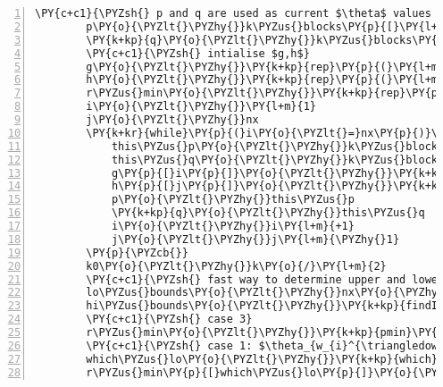 \begin{Verbatim}[commandchars=\\\{\},codes={\catcode`\$=3\catcode`\^=7\catcode`\_=8},gobble=0,numbers=left,fontfamily=fvm,fontshape=n,fontsize=\footnotesize,tabsize=2]
		\PY{c+c1}{\PYZsh{} p and q are used as current $\theta$ values running along the $\Theta$ vector}
		p\PY{o}{\PYZlt{}\PYZhy{}}k\PYZus{}blocks\PY{p}{[}\PY{l+m}{1}\PY{p}{]}
		\PY{k+kp}{q}\PY{o}{\PYZlt{}\PYZhy{}}k\PYZus{}blocks\PY{p}{[}nx\PY{l+m}{+2}\PY{p}{]}
		\PY{c+c1}{\PYZsh{} intialise $g,h$}
		g\PY{o}{\PYZlt{}\PYZhy{}}\PY{k+kp}{rep}\PY{p}{(}\PY{l+m}{0}\PY{p}{,}nx\PY{p}{)}
		h\PY{o}{\PYZlt{}\PYZhy{}}\PY{k+kp}{rep}\PY{p}{(}\PY{l+m}{0}\PY{p}{,}nx\PY{p}{)}
		r\PYZus{}min\PY{o}{\PYZlt{}\PYZhy{}}\PY{k+kp}{rep}\PY{p}{(}\PY{l+m}{0}\PY{p}{,}nx\PY{p}{)}
		i\PY{o}{\PYZlt{}\PYZhy{}}\PY{l+m}{1}
		j\PY{o}{\PYZlt{}\PYZhy{}}nx
		\PY{k+kr}{while}\PY{p}{(}i\PY{o}{\PYZlt{}=}nx\PY{p}{)}\PY{p}{\PYZob{}}
			this\PYZus{}p\PY{o}{\PYZlt{}\PYZhy{}}k\PYZus{}blocks\PY{p}{[}i\PY{l+m}{+1}\PY{p}{]}
			this\PYZus{}q\PY{o}{\PYZlt{}\PYZhy{}}k\PYZus{}blocks\PY{p}{[}j\PY{l+m}{+1}\PY{p}{]}
			g\PY{p}{[}i\PY{p}{]}\PY{o}{\PYZlt{}\PYZhy{}}\PY{k+kp}{ifelse}\PY{p}{(}p\PY{o}{==}this\PYZus{}p\PY{p}{,}\PY{k+kp}{min}\PY{p}{(}g\PY{p}{[}i\PY{l+m}{\PYZhy{}1}\PY{p}{]}\PY{p}{,}f\PY{p}{[}i\PY{p}{]}\PY{p}{)}\PY{p}{,}f\PY{p}{[}i\PY{p}{]}\PY{p}{)}
			h\PY{p}{[}j\PY{p}{]}\PY{o}{\PYZlt{}\PYZhy{}}\PY{k+kp}{ifelse}\PY{p}{(}q\PY{o}{==}this\PYZus{}q\PY{p}{,}\PY{k+kp}{min}\PY{p}{(}h\PY{p}{[}j\PY{l+m}{+1}\PY{p}{]}\PY{p}{,}f\PY{p}{[}j\PY{p}{]}\PY{p}{)}\PY{p}{,}f\PY{p}{[}j\PY{p}{]}\PY{p}{)}
			p\PY{o}{\PYZlt{}\PYZhy{}}this\PYZus{}p
			\PY{k+kp}{q}\PY{o}{\PYZlt{}\PYZhy{}}this\PYZus{}q
			i\PY{o}{\PYZlt{}\PYZhy{}}i\PY{l+m}{+1}
			j\PY{o}{\PYZlt{}\PYZhy{}}j\PY{l+m}{\PYZhy{}1}
		\PY{p}{\PYZcb{}}
		k0\PY{o}{\PYZlt{}\PYZhy{}}k\PY{o}{/}\PY{l+m}{2}
		\PY{c+c1}{\PYZsh{} fast way to determine upper and lower indexes in R to avoid looping}
		lo\PYZus{}bounds\PY{o}{\PYZlt{}\PYZhy{}}nx\PY{o}{\PYZhy{}}\PY{k+kp}{rev}\PY{p}{(}\PY{k+kp}{findInterval}\PY{p}{(}\PY{k+kp}{rev}\PY{p}{(}\PY{o}{\PYZhy{}}x\PY{p}{)}\PY{p}{,}\PY{k+kp}{rev}\PY{p}{(}\PY{o}{\PYZhy{}}\PY{p}{(}x\PY{o}{+}k0\PY{p}{)}\PY{p}{)}\PY{p}{)}\PY{p}{)}\PY{l+m}{+1}
		hi\PYZus{}bounds\PY{o}{\PYZlt{}\PYZhy{}}\PY{k+kp}{findInterval}\PY{p}{(}x\PY{o}{+}k0\PY{p}{,}x\PY{p}{)}
		\PY{c+c1}{\PYZsh{} case 3}
		r\PYZus{}min\PY{o}{\PYZlt{}\PYZhy{}}\PY{k+kp}{pmin}\PY{p}{(}h\PY{p}{[}lo\PYZus{}bounds\PY{p}{]}\PY{p}{,}g\PY{p}{[}hi\PYZus{}bounds\PY{p}{]}\PY{p}{)}
		\PY{c+c1}{\PYZsh{} case 1: $\theta_{w_{i}^{\triangledown}}=\theta_{w_{i}^{\vartriangle}}+1$}
		which\PYZus{}lo\PY{o}{\PYZlt{}\PYZhy{}}\PY{k+kp}{which}\PY{p}{(}k\PYZus{}blocks\PY{p}{[}lo\PYZus{}bounds\PY{p}{]}\PY{o}{==}k\PYZus{}blocks\PY{p}{[}hi\PYZus{}bounds\PY{l+m}{+1}\PY{p}{]}\PY{p}{)}
		r\PYZus{}min\PY{p}{[}which\PYZus{}lo\PY{p}{]}\PY{o}{\PYZlt{}\PYZhy{}}h\PY{p}{[}lo\PYZus{}bounds\PY{p}{[}which\PYZus{}lo\PY{p}{]]}

\end{Verbatim}
